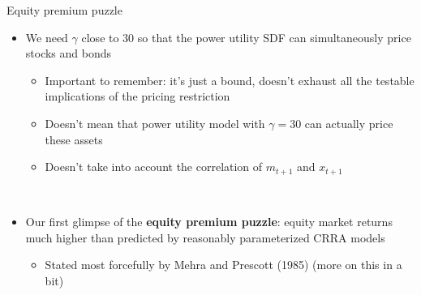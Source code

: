 \documentclass[xcolor=table, aspectratio=169]{beamer}
\newcommand{\alertbf}[1]{\alert{\textbf{#1}}}
\begin{document}
\begin{frame}{Equity premium puzzle}

\begin{itemize}
\item We need $\gamma$ close to 30 so that the power utility SDF can simultaneously price stocks and bonds
\begin{small}
\begin{itemize}
\item Important to remember: it's just a bound, doesn't exhaust all the testable implications of the pricing restriction
\item Doesn't mean that power utility model with $\gamma = 30$ can actually price these assets
\item Doesn't take into account the correlation of $m_{t+1}$ and $x_{t+1}$
\end{itemize}
\end{small}

~

\item Our first glimpse of the \alertbf{equity premium puzzle}: equity market returns much higher than predicted by reasonably parameterized CRRA models
\begin{itemize}
    \item Stated most forcefully by Mehra and Prescott (1985) (more on this in a bit)
\end{itemize}




\end{itemize}

\end{frame}
\end{document}
